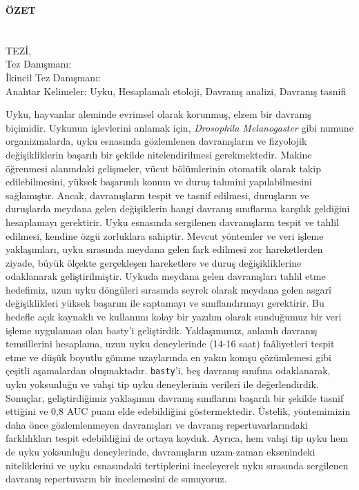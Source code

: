 \clearpage\pagebreak
\begin{center}
	\MakeUppercase{\textbf{Özet}} \\ [3\baselineskip]
	\MakeUppercase{\thesistitletr} \\ [3\baselineskip]
	\MakeUppercase{\student} \\[\baselineskip]
	\MakeUppercase{\majortr \degreetr Tez\.{ı}, \monthtr~\year} \\[\baselineskip]
	Tez Danışmanı: \advisortr \\
	İkincil Tez Danışmanı: \coadvisortr \\
	[2\baselineskip]
	Anahtar Kelimeler: Uyku, Hesaplamalı etoloji, Davranış analizi, Davranış tasnifi
\end{center}

\singlespacing

Uyku, hayvanlar aleminde evrimsel olarak korunmuş, elzem bir davranış biçimidir.
Uykunun işlevlerini anlamak için, \textit{Drosophila Melanogaster} gibi numune organizmalarda, uyku esnasında gözlemlenen davranışların ve fizyolojik değişikliklerin başarılı bir şekilde nitelendirilmesi gerekmektedir.
Makine öğrenmesi alanındaki gelişmeler, vücut bölümlerinin otomatik olarak takip edilebilmesini, yüksek başarımlı konum ve duruş tahmini yapılabilmesini sağlamıştır.
Ancak, davranışların tespit ve tasnif edilmesi, duruşların ve duruşlarda meydana gelen değişiklerin hangi davranış sınıflarına karşılık geldiğini hesaplamayı gerektirir.
Uyku esnasında sergilenen davranışların tespit ve tahlil edilmesi, kendine özgü zorluklara sahiptir.
Mevcut yöntemler ve veri işleme yaklaşımları, uyku sırasında meydana gelen fark edilmesi zor hareketlerden ziyade, büyük ölçekte gerçekleşen hareketlere ve duruş değişikliklerine odaklanarak geliştirilmiştir.
Uykuda meydana gelen davranışları tahlil etme hedefimiz, uzun uyku döngüleri sırasında seyrek olarak meydana gelen asgarî değişiklikleri yüksek başarım ile saptamayı ve sınıflandırmayı gerektirir.
Bu hedefle açık kaynaklı ve kullanımı kolay bir yazılım olarak sunduğumuz bir veri işleme uygulaması olan basty’i geliştirdik.
Yaklaşımımız, anlamlı davranış temsillerini hesaplama, uzun uyku deneylerinde (14-16 saat) faâliyetleri tespit etme ve düşük boyutlu gömme uzaylarında en yakın komşu çözümlemesi gibi çeşitli aşamalardan oluşmaktadır.
\texttt{basty}'i, beş davranış sınıfına odaklanarak, uyku yoksunluğu ve vahşi tip uyku deneylerinin verileri ile değerlendirdik.
Sonuçlar, geliştirdiğimiz yaklaşımın davranış sınıflarını başarılı bir şekilde tasnif ettiğini ve 0,8 AUC puanı elde edebildiğini göstermektedir.
Üstelik, yöntemimizin daha önce gözlemlenmeyen davranışları ve davranış repertuvarlarındaki farklılıkları tespit edebildiğini de ortaya koyduk.
Ayrıca, hem vahşi tip uyku hem de uyku yoksunluğu deneylerinde, davranışların uzam-zaman eksenindeki niteliklerini ve uyku esnasındaki tertiplerini inceleyerek uyku sırasında sergilenen davranış repertuvarın bir incelemesini de sunuyoruz.

\onehalfspacing
